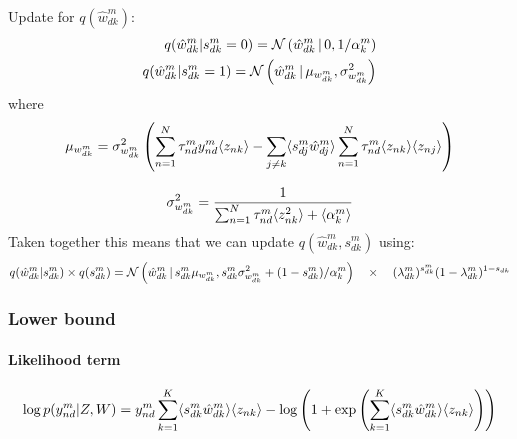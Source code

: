\documentclass[10pt, a4paper,openany]{paper}
\begin{document}
Update for $q(\hat{w}_{dk}^m)$:
\begin{align*}
q(\hat{w}_{dk}^m|s_{dk}^m=0) = \mathcal{N}\left(\hat{w}_{dk}^m \,|\, 0,1/\alpha_k^m\right) \\
q(\hat{w}_{dk}^m|s_{dk}^m=1) = \mathcal{N}\left(\hat{w}_{dk}^m \,|\, \mu_{w_{dk}^m},\sigma_{w_{dk}^m}^2\right)
\end{align*}
where
\[
\mu_{w_{dk}^m} = \sigma^2_{w_{dk}^m} \left(\sum_{n=1}^N  \tau_{nd}^m  y_{nd}^m \langle z_{nk} \rangle -  \sum_{j \neq k} \langle s_{dj}^m\hat{w}_{dj}^m \rangle\sum_{n=1}^N  \tau_{nd}^m \langle z_{nk} \rangle \langle z_{nj} \rangle \right)
\]

\[
\sigma^2_{w_{dk}^m} = \frac{1 } { \sum_{n=1}^{N} \tau_{nd}^m \langle z_{nk}^2 \rangle + \langle\alpha_k^m\rangle}
\]
Taken together this means that we can update $q(\hat{w}_{dk}^m,s_{dk}^m)$ using:
\[
q(\hat{w}_{dk}^m|s_{dk}^m) \times q(s_{dk}^m) = \mathcal{N}\left( \hat{w}_{dk}^m  \,|\,  s_{dk}^m \mu_{w_{dk}^m}, s_{dk}^m\sigma_{w_{dk}^m}^2 + (1-s_{dk}^m)/\alpha_k^m\right) \quad \times \quad (\lambda_{dk}^m)^{s_{dk}^m} (1-\lambda_{dk}^m)^{1-s_{dk}}
\]


\subsubsection{Lower bound}

\paragraph{Likelihood term}

\[
\log p(y^m_{nd}|Z,W)=y^m_{nd}\sum_{k=1}^{K}\langle s_{dk}^m \hat{w}_{dk}^m \rangle \langle z_{nk} \rangle - \log\left(1+\exp\left(\sum_{k=1}^{K}\langle s_{dk}^m \hat{w}_{dk}^m \rangle \langle z_{nk}\rangle\right)\right)
\]




\end{document}
